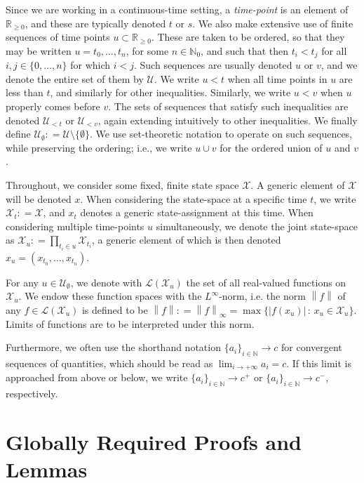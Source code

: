 \documentclass[twoside,11pt]{article}
\newcommand{\nats}{\mathbb{N}}
\newcommand{\natswith}{\nats_{0}}
\newcommand{\reals}{\mathbb{R}}
\newcommand{\realsnonneg}{\reals_{\geq 0}}
\newcommand{\states}{\mathcal{X}}
\newcommand{\gambles}{\mathcal{L}}
\newcommand{\norm}[1]{\left\lVert #1 \right\rVert}
\newcommand{\abs}[1]{\left\vert #1 \right\vert}
\newcommand{\coloneqq}{:\!=}
\begin{document}
Since we are working in a continuous-time setting, a \emph{time-point} is an element of $\realsnonneg$, and these are typically denoted $t$ or $s$. We also make extensive use of finite sequences of time points $u\subset\realsnonneg$. These are taken to be ordered, so that they may be written $u=t_0,\ldots,t_n$, for some $n\in\natswith$, and such that then $t_i<t_j$ for all $i,j\in\{0,\ldots,n\}$ for which $i< j$. Such sequences are usually denoted $u$ or $v$, and we denote the entire set of them by $\mathcal{U}$. We write $u<t$ when all time points in $u$ are less than $t$, and similarly for other inequalities. Similarly, we write $u<v$ when $u$ properly comes before $v$. The sets of sequences that satisfy such inequalities are denoted $\mathcal{U}_{<t}$ or $\mathcal{U}_{<v}$, again extending intuitively to other inequalities. We finally define $\mathcal{U}_\emptyset\coloneqq \mathcal{U}\setminus\{\emptyset\}$. We use set-theoretic notation to operate on such sequences, while preserving the ordering; i.e., we write $u\cup v$ for the ordered union of $u$ and $v$.

Throughout, we consider some fixed, finite state space $\states$. A generic element of $\states$ will be denoted $x$. When considering the state-space at a specific time $t$, we write $\states_t\coloneqq\states$, and $x_t$ denotes a generic state-assignment at this time. When considering multiple time-points $u$ simultaneously, we denote the joint state-space as $\states_u\coloneqq\prod_{t_i\in u}\states_{t_i}$, a generic element of which is then denoted $x_u=(x_{t_0},\ldots,x_{t_n})$.

For any $u\in\mathcal{U}_\emptyset$, we denote with $\gambles(\states_u)$ the set of all real-valued functions on $\states_u$. We endow these function spaces with the $L^\infty$-norm, i.e. the norm $\norm{f}$ of any $f\in\gambles(\states_u)$ is defined to be $\norm{f}\coloneqq\norm{f}_\infty=\max\{\abs{f(x_u)}\,:\,x_u\in\states_u\}$. Limits of functions are to be interpreted under this norm.

Furthermore, we often use the shorthand notation $\{a_i\}_{i\in\nats}\to c$ for convergent sequences of quantities, which should be read as $\lim_{i\to+\infty}a_i=c$. If this limit is approached from above or below, we write $\{a_i\}_{i\in\nats}\to c^+$ or $\{a_i\}_{i\in\nats}\to c^-$, respectively.

\section{Globally Required Proofs and Lemmas}
\end{document}
